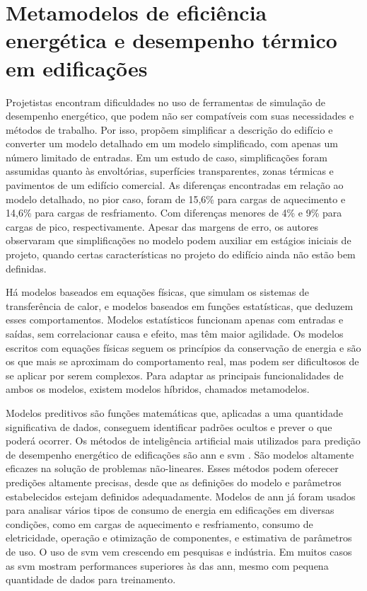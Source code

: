 \documentclass[brazil,hardcopy,openany]{ufscthesis} %
\begin{document}
\section{Metamodelos de eficiência energética e desempenho térmico em edificações}
Projetistas encontram dificuldades no uso de ferramentas de simulação de desempenho energético, que podem não ser compatíveis com suas necessidades e métodos de trabalho. Por isso,  propõem simplificar a descrição do edifício e converter um modelo detalhado em um modelo simplificado, com apenas um número limitado de entradas. Em um estudo de caso, simplificações foram assumidas quanto às envoltórias, superfícies transparentes, zonas térmicas e pavimentos de um edifício comercial. As diferenças encontradas em relação ao modelo detalhado, no pior caso, foram de 15,6\% para cargas de aquecimento e 14,6\% para cargas de resfriamento. Com diferenças menores de 4\% e 9\% para cargas de pico, respectivamente. Apesar das margens de erro, os autores observaram que simplificações no modelo podem auxiliar em estágios iniciais de projeto, quando certas características no projeto do edifício ainda não estão bem definidas.

Há modelos baseados em equações físicas, que simulam os sistemas de transferência de calor, e modelos baseados em funções estatísticas, que deduzem esses comportamentos. Modelos estatísticos funcionam apenas com entradas e saídas, sem correlacionar causa e efeito, mas têm maior agilidade. 
Os modelos escritos com equações físicas seguem os princípios da conservação de energia e são os que mais se aproximam do comportamento real, mas podem ser dificultosos de se aplicar por serem complexos. Para adaptar as principais funcionalidades de ambos os modelos, existem modelos híbridos, chamados metamodelos.

Modelos preditivos são funções matemáticas que, aplicadas a uma quantidade significativa de dados, conseguem identificar padrões ocultos e prever o que poderá ocorrer. Os métodos de inteligência artificial mais utilizados para predição de desempenho energético de edificações são \acrfull{ann} e \acrfull{svm} \cite{Zhao2012}. São modelos altamente eficazes na solução de problemas não-lineares. Esses métodos podem oferecer predições altamente precisas, desde que as definições do modelo e parâmetros estabelecidos estejam definidos adequadamente. Modelos de \acrshort{ann} já foram usados para analisar vários tipos de consumo de energia em edificações em diversas condições, como em cargas de aquecimento e resfriamento, consumo de eletricidade, operação e otimização de componentes, e estimativa de parâmetros de uso. O uso de \acrshort{svm} vem crescendo em pesquisas e indústria. Em muitos casos as \acrshort{svm} mostram performances superiores às das \acrshort{ann}, mesmo com pequena quantidade de dados para treinamento.
\end{document}
